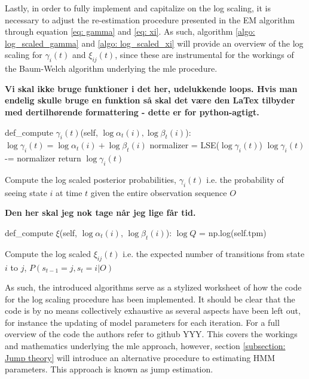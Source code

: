 Lastly, in order to fully implement and capitalize on the log scaling, it is necessary to adjust the re-estimation procedure presented in the EM algorithm through equation \ref{eq: gamma} and \ref{eq: xi}. As such, algorithm \ref{algo: log_scaled_gamma} and \ref{algo: log_scaled_xi} will provide an overview of the log scaling for $\gamma_i(t)$ and $\xi_{ij}(t)$, since these are instrumental for the workings of the Baum-Welch algorithm underlying the mle procedure.

\textbf{Vi skal ikke bruge funktioner i det her, udelukkende loops. Hvis man endelig skulle bruge en funktion så skal det være den LaTex tilbyder med dertilhørende formattering - dette er for python-agtigt.}

\begin{algorithm}[H]
def\_compute $\gamma_i(t)$(self, $\log\alpha_t(i), \log\beta_t(i)$): \;
\Indp 
$\log\gamma_i(t) = \log\alpha_t(i) + \log\beta_t(i)$ \;
normalizer = LSE($\log\gamma_i(t)$) \;
$\log\gamma_i(t)$ -= normalizer \;
\BlankLine
return $\log\gamma_i(t)$
\caption{Compute the log scaled posterior probabilities, $\gamma_i(t)$ i.e. the probability of seeing state $i$ at time $t$ given the entire observation sequence $O$}
\label{algo: log_scaled_gamma}
\end{algorithm}

\newpage

\textbf{Den her skal jeg nok tage når jeg lige får tid.}

\begin{algorithm}[H]
def\_compute $\xi$(self, $\log\alpha_t(i)$, $\log\beta_t(i)$): \;
\Indp 
$\log Q$ = np.log(self.tpm) \;
\BlankLine


\caption{Compute the log scaled $\xi_{ij}(t)$ i.e. the expected number of transitions from state $i$ to $j$, $P(s_{t-1} = j, s_t = i |O)$}
\label{algo: log_scaled_xi}
\end{algorithm}

As such, the introduced algorithms serve as a stylized worksheet of how the code for the log scaling procedure has been implemented. It should be clear that the code is by no means collectively exhaustive as several aspects have been left out, for instance the updating of model parameters for each iteration. For a full overview of the code the authors refer to github YYY. This covers the workings and mathematics underlying the mle approach, however, section \ref{subsection: Jump theory} will introduce an alternative procedure to estimating HMM parameters. This approach is known as jump estimation. 

